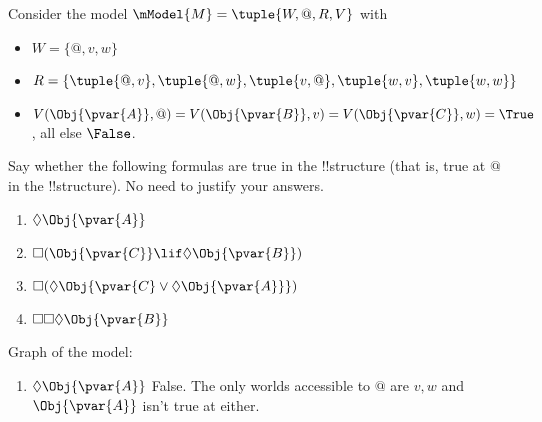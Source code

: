 \documentclass[../../../include/open-logic-section]{subfiles}
\begin{document}
\begin{prob}
    Consider the model $\mModel{M}=\tuple{W,@,R,V}$ with
    \begin{itemize}
        \item $W=\{@,v,w\}$
        \item $R=\{\tuple{@,v},\tuple{@,w},\tuple{v,@},\tuple{w,v},\tuple{w,w}\}$
        \item
        $V(\Obj{\pvar{A}},@)=V(\Obj{\pvar{B}},v)=V(\Obj{\pvar{C}},w)=\True$,
        all else $\False$.
    \end{itemize}
    Say whether the following formulas are true in the !!{structure}
    (that is, true at $@$ in the !!{structure}). No need to justify
    your answers.
    \begin{enumerate}
        \item $\Diamond \Obj{\pvar{A}}$
        \item $\Box(\Obj{\pvar{C}}\lif\Diamond\Obj{\pvar{B}})$
        \item $\Box(\Diamond\Obj{\pvar{C}\lor\Diamond\Obj{\pvar{A}}})$
        \item $\Box\Box\Diamond\Obj{\pvar{B}}$
    \end{enumerate} 
    
    \begin{ans}
        Graph of the model:
    
        \begin{center}
      \end{center}
        \begin{enumerate}
            \item $\Diamond \Obj{\pvar{A}}$ False. The only worlds
            accessible to $@$ are $v,w$ and $\Obj{\pvar{A}}$ isn't
            true at either.


\end{enumerate}
\end{ans}
\end{prob}
\end{document}

